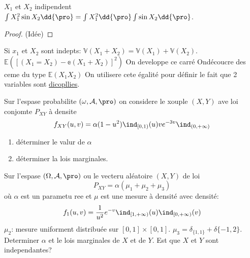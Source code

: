 \begin{examplebox}
	$X_1$ et $X_2$ indipendent $\int X_1^2 \sin X_2\dd{\pro}=\int X_1^2 \dd{\pro} \int \sin X_2\dd{\pro}$.
\end{examplebox}

\begin{proof}
	(Idée) %
\end{proof}

Si $x_1$ et $X_2$ sont indepts: $\mathbb{V}(X_1+X_2)=\mathbb{V}(X_1)+\mathbb{V}(X_2)$.
$\mathbb{E}([(X_1=X_2)-\mathbb{e}(X_1+X_2)]^2)$ On developpe ce carré Ondécoucre des ceme du type $\mathbb{E}(X_1X_2)$ On utilisere cete égalité pour définir le fait que 2 variables sont \underline{dicopllies}.

\begin{examplebox}
	Sur l'espase probabilite $(\omega, \mathcal{A}, \pro)$ on considere le xouple $(X, Y)$ ave loi conjomte $P_{XY}$ à densite
	$$f_{XY}(u,v)=\alpha(1-u^2)\ind_{[0,1)}(u)v e^{-3v}\ind_{(0, +\infty)}$$
	\begin{enumerate}
		\item déterminer le valur de $\alpha$
		\item déterminer la lois marginales.
	\end{enumerate}
\end{examplebox}

\begin{examplebox}
	Sur l'espase $(\Omega,\mathcal{A},\pro)$ ou le vecteru aléatoire $(X, Y)$ de loi
	$$P_{XY}=\alpha(\mu_1+\mu_2+\mu_3)$$
	où $\alpha$ est un parametu ree et $\mu$ est une mesure à densité avec densité:
		$$f_1(u, v)=\frac{1}{u^2}e^{-v}\ind_{[1,+\infty)}(u)\ind_{[0, +\infty)}(v)$$
	$\mu_2$: mesure uniforment distribuée sur $[0,1]\times[0,1]$. $\mu_3=\delta_{\{1,1\}}+\delta{\{-1,2\}}$. Determiner $\alpha$ et le lois marginales de $X$ et de $Y$. Est que $X$ et $Y$ sont independantes?
\end{examplebox}
